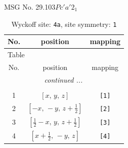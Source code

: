 \documentclass[fleqn,8pt]{jsarticle}
\begin{document}
\setcounter{MaxMatrixCols}{32}

\renewcommand{\tablename}{Table~}
\renewcommand{\figurename}{Figure~}
\begin{center}
\LARGE
MSG No. 29.103\quad$Pc'a'2_{1}$
\end{center}
\renewcommand{\arraystretch}{1.2}
\begin{longtable}{ccc}
\caption{Wyckoff site: {\tt 4a}, site symmetry: {\tt 1}}
 \\
 \hline \hline
No. & position & mapping \\ \hline \endfirsthead

\multicolumn{2}{l}{\tablename\ \thetable{}} \\
 \hline \hline
No. & position & mapping \\ \hline \endhead

 \hline \hline
\multicolumn{2}{r}{\footnotesize\it continued ...} \\ \endfoot

 \hline \hline
\multicolumn{2}{r}{} \\ \endlastfoot

1 & $\left[ x,\, y,\, z \right]$ & {\tt [1]} \\ \hline
2 & $\left[ - x,\, - y,\, z + \frac{1}{2} \right]$ & {\tt [2]} \\ \hline
3 & $\left[ \frac{1}{2} - x,\, y,\, z + \frac{1}{2} \right]$ & {\tt [3]} \\ \hline
4 & $\left[ x + \frac{1}{2},\, - y,\, z \right]$ & {\tt [4]} \\
\end{longtable}
\end{document}

